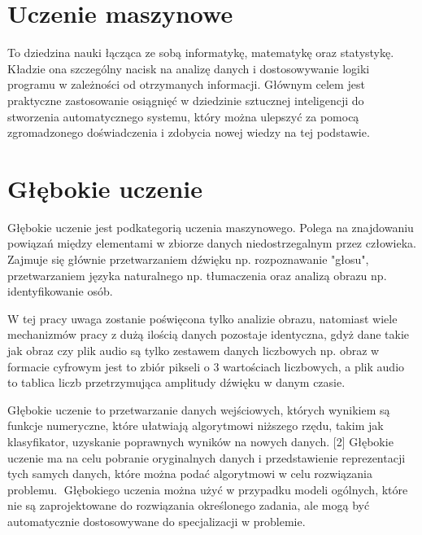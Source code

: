 \documentclass[brudnopis]{xmgr}
\begin{document}
\section{Uczenie maszynowe}

To dziedzina nauki łącząca ze sobą informatykę, matematykę oraz statystykę. Kładzie ona szczególny nacisk na analizę danych i dostosowywanie logiki programu w zależności od otrzymanych informacji. Głównym celem jest praktyczne zastosowanie osiągnięć w dziedzinie sztucznej inteligencji do stworzenia automatycznego systemu, który można ulepszyć za pomocą zgromadzonego doświadczenia i zdobycia nowej wiedzy na tej podstawie.

\section{Głębokie uczenie }

Głębokie uczenie jest podkategorią uczenia maszynowego. Polega na znajdowaniu powiązań między elementami w zbiorze danych niedostrzegalnym przez człowieka. Zajmuje się głównie przetwarzaniem dźwięku np. rozpoznawanie "głosu", przetwarzaniem języka naturalnego np. tłumaczenia oraz analizą obrazu np. identyfikowanie osób.

W tej pracy uwaga zostanie poświęcona tylko analizie obrazu, natomiast wiele mechanizmów pracy z dużą ilością danych pozostaje identyczna, gdyż dane takie jak obraz czy plik audio są tylko zestawem danych liczbowych np. obraz w formacie cyfrowym jest to zbiór pikseli o 3 wartościach liczbowych, a plik audio to tablica liczb przetrzymująca amplitudy dźwięku w danym czasie.

Głębokie uczenie to przetwarzanie danych wejściowych, których wynikiem są funkcje numeryczne, które ułatwiają algorytmowi niższego rzędu, takim jak klasyfikator, uzyskanie poprawnych wyników na nowych danych. [2] Głębokie uczenie ma na celu pobranie oryginalnych danych i przedstawienie reprezentacji tych samych danych, które można podać algorytmowi w celu rozwiązania problemu. 
􏰁Głębokiego uczenia można użyć w przypadku modeli ogólnych, które nie są zaprojektowane do rozwiązania określonego zadania, ale mogą być automatycznie dostosowywane do specjalizacji w problemie.
\end{document}
